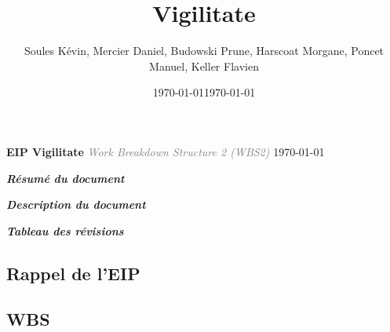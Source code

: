 \documentclass[a4paper,12pt]{report}
\title{\doctitle{} Vigilitate}
\author{Soules Kévin, Mercier Daniel, Budowski Prune, Harscoat Morgane, Poncet Manuel, Keller Flavien}
\date{\today}
\newcommand{\doctitle}{WBS2}
\newcommand{\doclongtitle}{Work Breakdown Structure 2}
\begin{document}
\date{\slashdate\today}
\setcounter{page}{-3}


\thispagestyle{empty}
\begin{center}
  \textcolor{myBlue}{\Huge \textbf{EIP Vigilitate}}\linebreak
  \textcolor{gray}{\textit{\Large \doclongtitle{} (\doctitle{})}}\linebreak
  {\today}
\end{center}
\newpage


\begin{flushleft}
  \textcolor{myBlue}{\textit{\large \textbf{Résumé du document}}}\linebreak
\end{flushleft}

\newpage


\begin{flushleft}
  \textcolor{myBlue}{\textit{\large \textbf{Description du document}}} 
  \bigbreak
  
  \bigbreak
  \bigbreak
  \textcolor{myBlue}{\textit{\large \textbf{Tableau des révisions}}}
  \bigbreak
  
\end{flushleft}


\tableofcontents


\textcolor{myBlue}{\chapter{Rappel de l'EIP}}
\setcounter{page}{1}



\textcolor{myBlue}{\chapter{WBS}}
\end{document}
